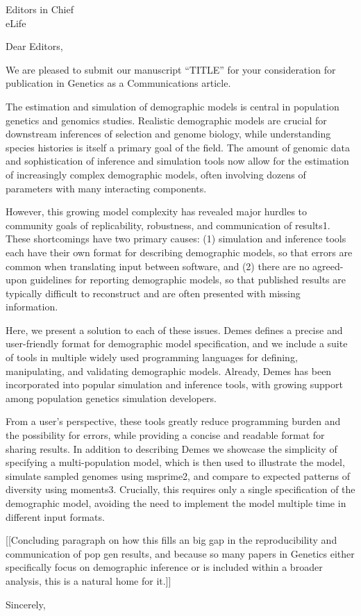 \documentclass[10pt,stdletter,dateno]{letter}
\begin{document}
\begin{letter}{
  Editors in Chief \\ 
  eLife 
}

\opening{Dear Editors,}

We are pleased to submit our manuscript “TITLE” for your consideration for publication in Genetics as a Communications article.

The estimation and simulation of demographic models is central in population genetics and genomics studies. Realistic demographic models are crucial for downstream inferences of selection and genome biology, while understanding species histories is itself a primary goal of the field. The amount of genomic data and sophistication of inference and simulation tools now allow for the estimation of increasingly complex demographic models, often involving dozens of parameters with many interacting components.

However, this growing model complexity has revealed major hurdles to community goals of replicability, robustness, and communication of results1. These shortcomings have two primary causes: (1) simulation and inference tools each have their own format for describing demographic models, so that errors are common when translating input between software, and (2) there are no agreed-upon guidelines for reporting demographic models, so that published results are typically difficult to reconstruct and are often presented with missing information.

Here, we present a solution to each of these issues. Demes defines a precise and user-friendly format for demographic model specification, and we include a suite of tools in multiple widely used programming languages for defining, manipulating, and validating demographic models. Already, Demes has been incorporated into popular simulation and inference tools, with growing support among population genetics simulation developers.

From a user’s perspective, these tools greatly reduce programming burden and the possibility for errors, while providing a concise and readable format for sharing results. In addition to describing Demes we showcase the simplicity of specifying a multi-population model, which is then used to illustrate the model, simulate sampled genomes using msprime2, and compare to expected patterns of diversity using moments3. Crucially, this requires only a single specification of the demographic model, avoiding the need to implement the model multiple time in different input formats.

[[Concluding paragraph on how this fills an big gap in the reproducibility and communication of pop gen results, and because so many papers in Genetics either specifically focus on demographic inference or is included within a broader analysis, this is a natural home for it.]]

\closing{Sincerely,}
\end{letter}
\end{document}
